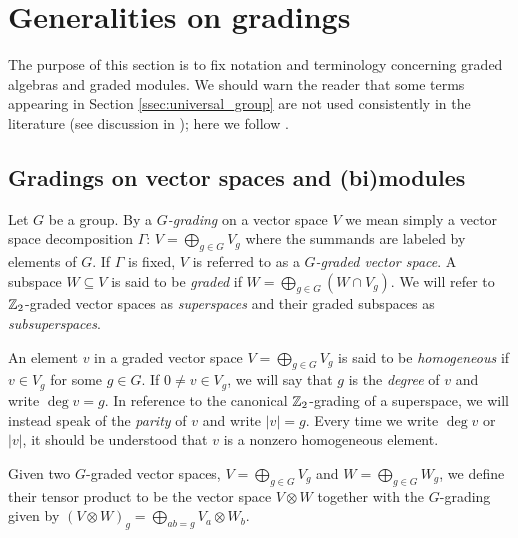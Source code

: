 % 

\chapter{Generalities on gradings}\label{sec:generalities}

The purpose of this section is to fix notation and terminology concerning graded algebras and graded modules. We should warn the reader that some terms appearing in Section \ref{ssec:universal_group} are not used consistently in the literature (see discussion in \cite[\S 2.7]{GS}); here we follow \cite{livromicha}.

\section{Gradings on vector spaces and (bi)modules}\label{subsec:graded-bimodules}

Let $G$ be a group. By a \emph{$G$-grading} on a vector space $V$ we mean simply a vector space decomposition $\Gamma:\,V = \bigoplus_{g \in G} V_g$ where the summands are labeled by elements of $G$. If $\Gamma$ is fixed, $V$ is referred to as a {\em $G$-graded vector space}. A subspace $W \subseteq V$ is said to be \emph{graded} if $W = \bigoplus_{g \in G} (W \cap V_g)$. We will refer to $\mathbb{Z}_2$-graded vector spaces as \emph{superspaces} and their graded subspaces as \emph{subsuperspaces}.

An element $v$ in a graded vector space $V = \bigoplus_{g \in G} V_g$ is said to be \emph{homogeneous} if $v\in V_g$ for some $g\in G$. 
If $0\ne v\in V_g$, we will say that $g$ is the \emph{degree} of $v$ and write $\deg v = g$. 
In reference to the canonical $\mathbb{Z}_2$-grading of a superspace, we will instead speak of the \emph{parity} of $v$ and write $|v| = g$.
Every time we write $\deg v$ or $|v|$, it should be understood that $v$ is a nonzero homogeneous element.

\begin{defi}
	Given two $G$-graded vector spaces, $V=\bigoplus_{g\in G} V_g$ and $W=\bigoplus_{g\in G} W_g$, we define their tensor product to be the vector space $V\otimes W$
	together with the $G$-grading given by $(V \otimes W)_g = \bigoplus_{ab=g} V_{a} \otimes W_{b}$.
\end{defi}

